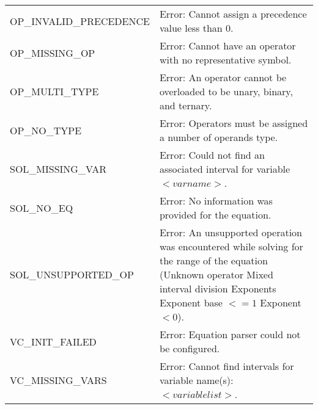 \documentclass[12pt, titlepage]{article}
\begin{document}
\begin{longtable}{l p{9.5cm}}
	OP\_INVALID\_PRECEDENCE & Error: Cannot assign a precedence value less than 
	0.\\
	OP\_MISSING\_OP & Error: Cannot have an operator with no representative 
	symbol. 
	\\
	OP\_MULTI\_TYPE & Error: An operator cannot be overloaded to be unary, 
	binary, and ternary. \\
	OP\_NO\_TYPE & Error: Operators must be assigned a number of operands type. 
	\\
	SOL\_MISSING\_VAR & Error: Could not find an associated interval for 
	variable $<varname>$. \\
	SOL\_NO\_EQ & Error: No information was provided for the equation. \\
	SOL\_UNSUPPORTED\_OP & Error: An unsupported operation was encountered 
	while solving for the range of the equation (Unknown operator \textbar 
	Mixed interval division \textbar Exponents \textbar Exponent base $<= 1$ 
	\textbar Exponent $< 0$).\\
	VC\_INIT\_FAILED & Error: Equation parser could not be configured. \\
	VC\_MISSING\_VARS & Error: Cannot find intervals for variable name(s): 
	$<variable list>$. \\
	\bottomrule
\end{longtable}

\newpage
\end{document}
